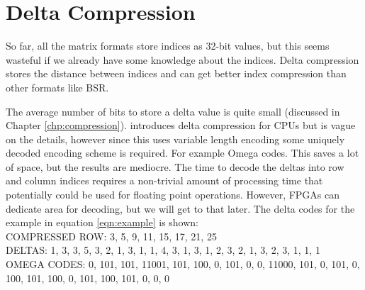 \section{Delta Compression}
So far, all the matrix formats store indices as 32-bit values, but this seems wasteful if we already have some knowledge about the indices. Delta compression stores the distance between indices and can get better index compression than other formats like BSR.
\par The average number of bits to store a delta value is quite small (discussed in Chapter \ref{chp:compression}). \cite{prelim:kourtis} introduces delta compression for CPUs but is vague on the details, however since this uses variable length encoding some uniquely decoded encoding scheme is required. For example Omega codes. This saves a lot of space, but the results are mediocre. The time to decode the deltas into row and column indices requires a non-trivial amount of processing time that potentially could be used for floating point operations. However, FPGAs can dedicate area for decoding, but we will get to that later. The delta codes for the example in equation \ref{eqn:example} is shown:\\
   COMPRESSED ROW: 3, 5, 9, 11, 15, 17, 21, 25 \\
DELTAS: 1, 3, 3, 5, 3, 2, 1, 3, 1, 1, 4, 3, 1, 3, 1, 2, 3, 2, 1, 3, 2, 3, 1, 1, 1\\
OMEGA CODES: 0, 101, 101, 11001, 101, 100, 0, 101, 0, 0, 11000, 101, 0, 101, 0, 100, 101, 100, 0, 101, 100, 101, 0, 0, 0 \par
